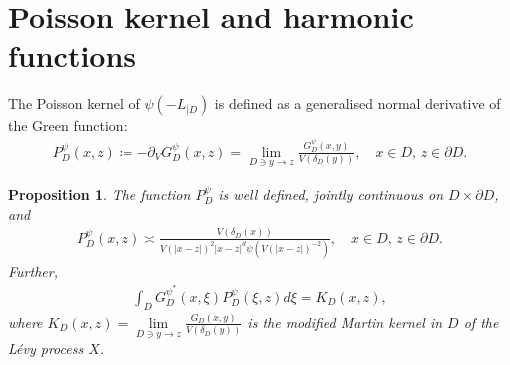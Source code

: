 \documentclass[12pt,a4paper,onecolumn]{article}
\newtheorem{prop}[thm]{Proposition}
\theoremstyle{definition}
\newcommand{\1}{\mathbf 1}
\newcommand{\de}{\delta_D}
\newcommand{\Lo}{\psi(-L_{|D})}
\newcommand{\GDP}{G_D^\psi}
\newcommand{\GDPs}{G_D^{\psi^*}}
\newcommand{\PDS}{P^{\psi}_{ D}}
\numberwithin{equation}{section}
\begin{document}
	\section{Poisson kernel and harmonic functions}\label{s:Poisson harmonic}
The Poisson kernel of $\Lo$ is defined as a generalised normal derivative of the
	Green function:
	\begin{align*}
		\PDS(x,z) \coloneqq -\partial_V\GDP(x,z)=\lim_{D\ni y\to
			z}\frac{\GDP(x,y)}{V(\de(y))},\quad x\in D,\, z\in \partial D.
	\end{align*}
	\begin{prop}\label{p:Poisson kernel}
		The function $\PDS$ is well defined, jointly continuous on $D\times	\partial D$, and 
		\begin{align}\label{eq:Poisson kernel sharp}
			\PDS(x,z)\asymp
			\frac{V(\de(x))}{V(|x-z|)^2|x-z|^{d}\psi(V(|x-z|)^{-2})},\quad x\in D,\, z\in
			\partial D.
		\end{align}
		Further,
		\begin{align}\label{eq:Green Poisson identity}
			\int_D \GDPs(x,\xi)\PDS(\xi,z)d\xi=K_D(x,z),
		\end{align}
		where $K_D(x,z)=\lim\limits_{D\ni y\to z}\frac{G_D(x,y)}{V(\de(y))}$ is the modified Martin kernel in $D$ of the L\'evy process $X$.
	\end{prop}
    
\end{document}
